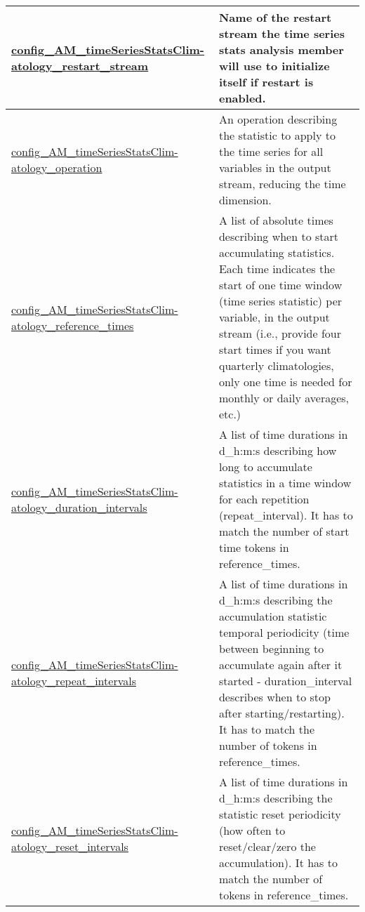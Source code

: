 {\begin{center}
\begin{longtable}{| p{2.0in} || p{4.0in} |}
    \hline
    \hyperref[subsec:nm_sec_config_AM_timeSeriesStatsClimatology_restart_stream]{config\_AM\_timeSeriesStatsClim-}\hyperref[subsec:nm_sec_config_AM_timeSeriesStatsClimatology_restart_stream]{atology\_restart\_stream}& Name of the restart stream the time series stats analysis member will use to initialize itself if restart is enabled. \\
    \hline
    \hyperref[subsec:nm_sec_config_AM_timeSeriesStatsClimatology_operation]{config\_AM\_timeSeriesStatsClim-}\hyperref[subsec:nm_sec_config_AM_timeSeriesStatsClimatology_operation]{atology\_operation}& An operation describing the statistic to apply to the time series for all variables in the output stream, reducing the time dimension. \\
    \hline
    \hyperref[subsec:nm_sec_config_AM_timeSeriesStatsClimatology_reference_times]{config\_AM\_timeSeriesStatsClim-}\hyperref[subsec:nm_sec_config_AM_timeSeriesStatsClimatology_reference_times]{atology\_reference\_times}& A list of absolute times describing when to start accumulating statistics. Each time indicates the start of one time window (time series statistic) per variable, in the output stream (i.e., provide four start times if you want quarterly climatologies, only one time is needed for monthly or daily averages, etc.) \\
    \hline
    \hyperref[subsec:nm_sec_config_AM_timeSeriesStatsClimatology_duration_intervals]{config\_AM\_timeSeriesStatsClim-}\hyperref[subsec:nm_sec_config_AM_timeSeriesStatsClimatology_duration_intervals]{atology\_duration\_intervals}& A list of time durations in d\_h:m:s describing how long to accumulate statistics in a time window for each repetition (repeat\_interval). It has to match the number of start time tokens in reference\_times. \\
    \hline
    \hyperref[subsec:nm_sec_config_AM_timeSeriesStatsClimatology_repeat_intervals]{config\_AM\_timeSeriesStatsClim-}\hyperref[subsec:nm_sec_config_AM_timeSeriesStatsClimatology_repeat_intervals]{atology\_repeat\_intervals}& A list of time durations in d\_h:m:s describing the accumulation statistic temporal periodicity (time between beginning to accumulate again after it started - duration\_interval describes when to stop after starting/restarting). It has to match the number of tokens in reference\_times. \\
    \hline
    \hyperref[subsec:nm_sec_config_AM_timeSeriesStatsClimatology_reset_intervals]{config\_AM\_timeSeriesStatsClim-}\hyperref[subsec:nm_sec_config_AM_timeSeriesStatsClimatology_reset_intervals]{atology\_reset\_intervals}& A list of time durations in d\_h:m:s describing the statistic reset periodicity (how often to reset/clear/zero the accumulation). It has to match the number of tokens in reference\_times. \\

\end{longtable}
\end{center}}
